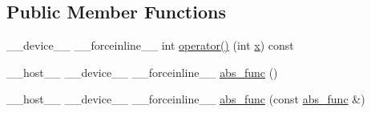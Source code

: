 \subsection*{Public Member Functions}
\begin{DoxyCompactItemize}
\item 
\-\_\-\-\_\-device\-\_\-\-\_\- \-\_\-\-\_\-forceinline\-\_\-\-\_\- int \hyperlink{structcv_1_1gpu_1_1device_1_1abs__func_3_01int_01_4_a67420d9136df08c46c3cf74fbc4170b0}{operator()} (int \hyperlink{highgui__c_8h_a6150e0515f7202e2fb518f7206ed97dc}{x}) const 
\item 
\-\_\-\-\_\-host\-\_\-\-\_\- \-\_\-\-\_\-device\-\_\-\-\_\- \-\_\-\-\_\-forceinline\-\_\-\-\_\- \hyperlink{structcv_1_1gpu_1_1device_1_1abs__func_3_01int_01_4_a25217788d857700189c3e3054f7af9bd}{abs\-\_\-func} ()
\item 
\-\_\-\-\_\-host\-\_\-\-\_\- \-\_\-\-\_\-device\-\_\-\-\_\- \-\_\-\-\_\-forceinline\-\_\-\-\_\- \hyperlink{structcv_1_1gpu_1_1device_1_1abs__func_3_01int_01_4_a44003f0a248486e802aec1417a36fcf1}{abs\-\_\-func} (const \hyperlink{structcv_1_1gpu_1_1device_1_1abs__func}{abs\-\_\-func} \&)
\end{DoxyCompactItemize}


